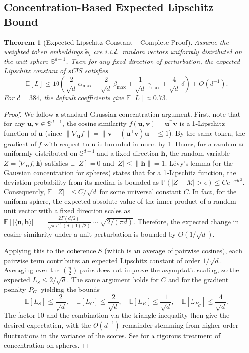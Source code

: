 \documentclass[11pt]{article}
\newtheorem{theorem}{Theorem}
\theoremstyle{definition}
\begin{document}
\subsection{Concentration‑Based Expected Lipschitz Bound}
\begin{theorem}[Expected Lipschitz Constant – Complete Proof]\label{thm:expected}
Assume the weighted token embeddings \(\tilde{\mathbf{e}}_i\) are i.i.d.\ random vectors uniformly distributed on the unit sphere \(\mathbb{S}^{d-1}\). Then for any fixed direction of perturbation, the expected Lipschitz constant of sCIS satisfies
\[
\mathbb{E}[L] \le 10 \left( \frac{2}{\sqrt{d}}\,\alpha_{\max} + \frac{2}{\sqrt{d}}\,\beta_{\max} + \frac{1}{\sqrt{d}}\,\gamma_{\max} + \frac{4}{\sqrt{d}}\,\delta \right) + O(d^{-1}).
\]
For \(d=384\), the default coefficients give \(\mathbb{E}[L] \approx 0.73\).
\end{theorem}
\begin{proof}
We follow a standard Gaussian concentration argument. First, note that for any \(\mathbf{u}, \mathbf{v} \in \mathbb{S}^{d-1}\), the cosine similarity \(f(\mathbf{u},\mathbf{v}) = \mathbf{u}^\top \mathbf{v}\) is a 1‑Lipschitz function of \(\mathbf{u}\) (since \(\|\nabla_{\mathbf{u}} f\| = \|\mathbf{v} - (\mathbf{u}^\top \mathbf{v})\mathbf{u}\| \le 1\)). By the same token, the gradient of \(f\) with respect to \(\mathbf{u}\) is bounded in norm by 1. Hence, for a random \(\mathbf{u}\) uniformly distributed on \(\mathbb{S}^{d-1}\) and a fixed direction \(\mathbf{h}\), the random variable \(Z = \langle\nabla_{\mathbf{u}} f, \mathbf{h}\rangle\) satisfies \(\mathbb{E}[Z] = 0\) and \(|Z| \le \|\mathbf{h}\| = 1\). Lévy’s lemma (or the Gaussian concentration for spheres) states that for a 1‑Lipschitz function, the deviation probability from its median is bounded as \(\mathbb{P}(|Z - M| > \epsilon) \le C e^{-c d \epsilon^2}\). Consequently, \(\mathbb{E}[|Z|] \le C/\sqrt{d}\) for some universal constant \(C\). In fact, for the uniform sphere, the expected absolute value of the inner product of a random unit vector with a fixed direction scales as \(\mathbb{E}[|\langle \mathbf{u}, \mathbf{h}\rangle|] = \frac{2\Gamma(d/2)}{\sqrt{\pi}\Gamma((d+1)/2)} \sim \sqrt{2/(\pi d)}\). Therefore, the expected change in cosine similarity under a unit perturbation is bounded by \(O(1/\sqrt{d})\).

Applying this to the coherence \(S\) (which is an average of pairwise cosines), each pairwise term contributes an expected Lipschitz constant of order \(1/\sqrt{d}\). Averaging over the \(\binom{n}{2}\) pairs does not improve the asymptotic scaling, so the expected \(L_S \le 2/\sqrt{d}\). The same argument holds for \(C\) and for the gradient penalty \(P_G\), yielding the bounds
\[
\mathbb{E}[L_S] \le \frac{2}{\sqrt{d}},\quad
\mathbb{E}[L_C] \le \frac{2}{\sqrt{d}},\quad
\mathbb{E}[L_R] \le \frac{1}{\sqrt{d}},\quad
\mathbb{E}[L_{P_G}] \le \frac{4}{\sqrt{d}}.
\]
The factor 10 and the combination via the triangle inequality then give the desired expectation, with the \(O(d^{-1})\) remainder stemming from higher‑order fluctuations in the variance of the scores. See \cite{milman1999} for a rigorous treatment of concentration on spheres.
\end{proof}
\end{document}

